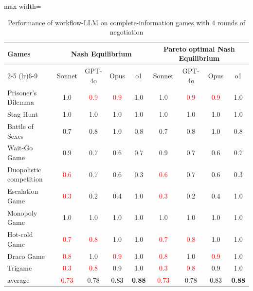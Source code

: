 \begin{table}[!ht]
    \centering
    \begin{adjustbox}{max width=\textwidth}
    \begin{tabular}{lc c c c c c c c}
    \toprule
        \multirow{2.5}{*}{\textbf{Games}} & \multicolumn{4}{c}{\bf Nash Equilibrium} & \multicolumn{4}{c}{\bf Pareto optimal Nash Equilibrium} \\ \cmidrule(lr){2-5}  \cmidrule(lr){6-9} 
           & Sonnet & GPT-4o & Opus & o1 & Sonnet & GPT-4o & Opus & o1  \\
           \midrule
        Prisoner's Dilemma & 1.0 & \textcolor{red}{0.9} & \textcolor{red}{0.9} & 1.0 & 1.0 & \textcolor{red}{0.9} & \textcolor{red}{0.9} & 1.0\\
        Stag Hunt & 1.0 & 1.0 & 1.0 & 1.0 & 1.0 & 1.0 & 1.0 & 1.0 \\
        Battle of Sexes & 0.7 & 0.8 & 1.0 & 0.8 & 0.7 & 0.8 & 1.0 & 0.8 \\
        Wait-Go Game & 0.9 & 0.7 & 0.6 & 0.7 & 0.9 & 0.7 & 0.6 & 0.7\\
        Duopolistic competition & \textcolor{red}{0.6} & 0.7 & 0.6 & 0.3 & \textcolor{red}{0.6} & 0.7 & 0.6 & 0.3\\
        Escalation Game & \textcolor{red}{0.3} & 0.2 & 0.4 & 1.0 & \textcolor{red}{0.3} & 0.2 & 0.4 & 1.0\\
        Monopoly Game & 1.0 & 1.0 & 1.0 & 1.0 & 1.0 & 1.0 & 1.0 & 1.0\\
        Hot-cold Game & \textcolor{red}{0.7} & \textcolor{red}{0.8} & 1.0 & 1.0 & \textcolor{red}{0.7} & \textcolor{red}{0.8} & 1.0 & 1.0\\
        Draco Game & \textcolor{red}{0.8} & 1.0 & \textcolor{red}{0.9} & 1.0 & \textcolor{red}{0.8} & 1.0 & \textcolor{red}{0.9} & 1.0\\
        Trigame & \textcolor{red}{0.3} & \textcolor{red}{0.8} & 0.9 & 1.0 & \textcolor{red}{0.3} & \textcolor{red}{0.8} & 0.9 & 1.0 \\
        \midrule
        average & \textcolor{red}{0.73} & 0.78 & 0.83 & \textbf{0.88} & \textcolor{red}{0.73} & 0.78 & 0.83 & \textbf{0.88}\\
        \bottomrule
    \end{tabular}
    \end{adjustbox}
    \caption{Performance of workflow-LLM on complete-information games with 4 rounds of negotiation}
    \label{tab:classic_w_neg_w_wf}
\end{table}

